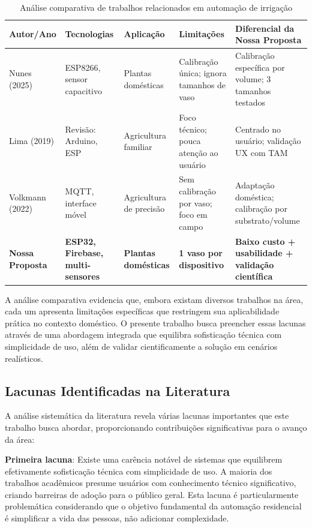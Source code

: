 \documentclass[twoside,english,brazilian]{UNISINOSmonografia}
\begin{document}
\begin{table}[htbp]
\centering
\caption{Análise comparativa de trabalhos relacionados em automação de irrigação}
\label{tab:comparativo}
\scriptsize
\begin{tabular}{p{2.2cm}p{2.0cm}p{2.6cm}p{2.8cm}p{3.0cm}}
\toprule
\textbf{Autor/Ano} & \textbf{Tecnologias} & \textbf{Aplicação} & \textbf{Limitações} & \textbf{Diferencial da Nossa Proposta} \\
\midrule
Nunes (2025) & ESP8266, sensor capacitivo & Plantas domésticas & Calibração única; ignora tamanhos de vaso & Calibração específica por volume; 3 tamanhos testados \\
\midrule
Lima (2019) & Revisão: Arduino, ESP & Agricultura familiar & Foco técnico; pouca atenção ao usuário & Centrado no usuário; validação UX com TAM \\
\midrule
Volkmann (2022) & MQTT, interface móvel & Agricultura de precisão & Sem calibração por vaso; foco em campo & Adaptação doméstica; calibração por substrato/volume \\
\midrule
\textbf{Nossa Proposta} & \textbf{ESP32, Firebase, multi-sensores} & \textbf{Plantas domésticas} & \textbf{1 vaso por dispositivo} & \textbf{Baixo custo + usabilidade + validação científica} \\
\bottomrule
\end{tabular}
\end{table}

A análise comparativa evidencia que, embora existam diversos trabalhos na área, cada um apresenta limitações específicas que restringem sua aplicabilidade prática no contexto doméstico. O presente trabalho busca preencher essas lacunas através de uma abordagem integrada que equilibra sofisticação técnica com simplicidade de uso, além de validar cientificamente a solução em cenários realísticos.

\subsection{Lacunas Identificadas na Literatura}

A análise sistemática da literatura revela várias lacunas importantes que este trabalho busca abordar, proporcionando contribuições significativas para o avanço da área:

\textbf{Primeira lacuna}: Existe uma carência notável de sistemas que equilibrem efetivamente sofisticação técnica com simplicidade de uso. A maioria dos trabalhos acadêmicos presume usuários com conhecimento técnico significativo, criando barreiras de adoção para o público geral. Esta lacuna é particularmente problemática considerando que o objetivo fundamental da automação residencial é simplificar a vida das pessoas, não adicionar complexidade.
\end{document}
